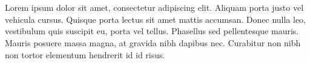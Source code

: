\section*{}


Lorem ipsum dolor sit amet, consectetur adipiscing elit. Aliquam porta justo vel vehicula cursus. Quisque porta lectus sit amet mattis accumsan. Donec nulla leo, vestibulum quis suscipit eu, porta vel tellus. Phasellus sed pellentesque mauris. Mauris posuere massa magna, at gravida nibh dapibus nec. Curabitur non nibh non tortor elementum hendrerit id id risus. 